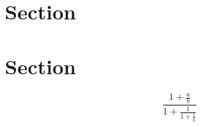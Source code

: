 \documentclass[a4paper]{article}
\begin{document}
\section{Section}

\section{Section}

\[ \frac{1+\frac{a}{b}}{1+\frac{1}{1+\frac{1}{a}}} \]
\end{document}
